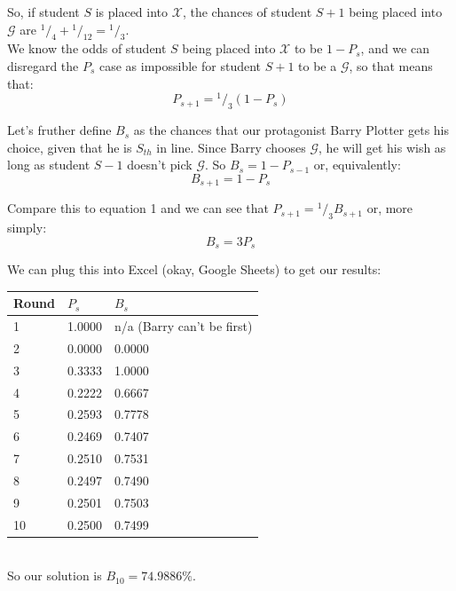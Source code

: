 \documentclass[10pt, letterpaper]{article}
\newcommand*\rfrac[2]{{}^{#1}\!/_{#2}}
\begin{document}
So, if student $S$ is placed into $\mathcal{X}$, the chances of student $S+1$ being placed into $\mathcal{G}$ are
$\rfrac{1}{4} + \rfrac{1}{12} = \rfrac{1}{3}$.\\

We know the odds of student $S$ being placed into $\mathcal{X}$ to be $1-P_s$, and we can disregard the $P_s$ case as impossible for student $S+1$ to be a $\mathcal{G}$, so that means that:
\begin{equation}
    P_{s+1} = \rfrac{1}{3}(1 - P_s)
\end{equation}

Let's fruther define $B_s$ as the chances that our protagonist Barry Plotter gets his choice, given that he is $S_{th}$ in line.
Since Barry chooses $\mathcal{G}$, he will get his wish as long as student $S-1$ doesn't pick $\mathcal{G}$. So
$B_s = 1 - P_{s-1}$
or, equivalently:
\begin{equation}
    B_{s+1} = 1 - P_s
\end{equation}

Compare this to equation 1 and we can see that $P_{s+1} = \rfrac{1}{3}B_{s+1}$ or, more simply:
\begin{equation}
    B_s = 3P_s
\end{equation}

\pagebreak
We can plug this into Excel (okay, Google Sheets) to get our results:\\

\begin{tabular}{l | l | l }
    Round   & $P_s$     & $B_s$ \\ \hline
    1       & 1.0000    & n/a (Barry can't be first)\\
    2       & 0.0000    & 0.0000 \\
    3       & 0.3333    & 1.0000 \\
    4       & 0.2222    & 0.6667 \\
    5       & 0.2593    & 0.7778 \\
    6       & 0.2469    & 0.7407 \\
    7       & 0.2510    & 0.7531 \\
    8       & 0.2497    & 0.7490 \\
    9       & 0.2501    & 0.7503 \\
    10      & 0.2500    & 0.7499 \\
\end{tabular}\\

So our solution is $B_{10} = 74.9886\%$.
\end{document}
